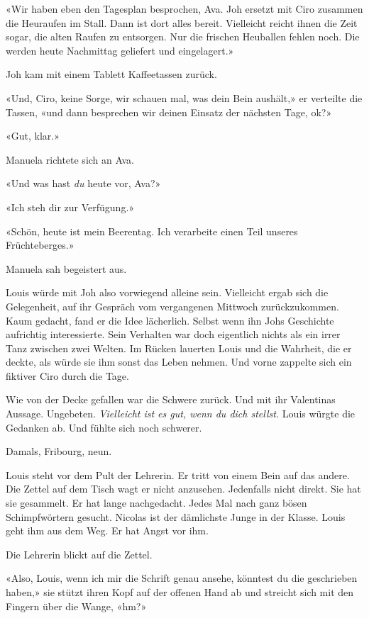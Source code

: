 «Wir haben eben den Tagesplan besprochen, Ava. Joh ersetzt mit Ciro
zusammen die Heuraufen im Stall. Dann ist dort alles bereit. Vielleicht
reicht ihnen die Zeit sogar, die alten Raufen zu entsorgen. Nur die
frischen Heuballen fehlen noch. Die werden heute Nachmittag geliefert
und eingelagert.»

Joh kam mit einem Tablett Kaffeetassen zurück.

«Und, Ciro, keine Sorge, wir schauen mal, was dein Bein aushält,» er
verteilte die Tassen, «und dann besprechen wir deinen Einsatz der
nächsten Tage, ok?»

«Gut, klar.»

Manuela richtete sich an Ava.

«Und was hast \emph{du} heute vor, Ava?»

«Ich steh dir zur Verfügung.»

«Schön, heute ist mein Beerentag. Ich verarbeite einen Teil unseres
Früchteberges.»

Manuela sah begeistert aus.

Louis würde mit Joh also vorwiegend alleine sein. Vielleicht ergab sich
die Gelegenheit, auf ihr Gespräch vom vergangenen Mittwoch
zurückzukommen. Kaum gedacht, fand er die Idee lächerlich. Selbst wenn
ihn Johs Geschichte aufrichtig interessierte. Sein Verhalten war doch
eigentlich nichts als ein irrer Tanz zwischen zwei Welten. Im Rücken
lauerten Louis und die Wahrheit, die er deckte, als würde sie ihm sonst
das Leben nehmen. Und vorne zappelte sich ein fiktiver Ciro durch die
Tage.

Wie von der Decke gefallen war die Schwere zurück. Und mit ihr
Valentinas Aussage. Ungebeten. \emph{Vielleicht ist es gut, wenn du dich
stellst.} Louis würgte die Gedanken ab. Und fühlte sich noch schwerer.

Damals, Fribourg, neun.

Louis steht vor dem Pult der Lehrerin. Er tritt von einem Bein auf das
andere. Die Zettel auf dem Tisch wagt er nicht anzusehen. Jedenfalls
nicht direkt. Sie hat sie gesammelt. Er hat lange nachgedacht. Jedes Mal
nach ganz bösen Schimpfwörtern gesucht. Nicolas ist der dämlichste Junge
in der Klasse. Louis geht ihm aus dem Weg. Er hat Angst vor ihm.

Die Lehrerin blickt auf die Zettel.

«Also, Louis, wenn ich mir die Schrift genau ansehe, könntest du die
geschrieben haben,» sie stützt ihren Kopf auf der offenen Hand ab und
streicht sich mit den Fingern über die Wange, «hm?»

